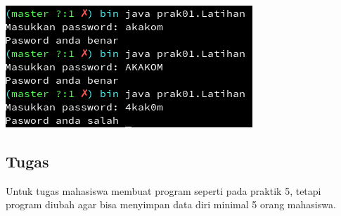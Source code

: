 \documentclass[a4paper,12pt]{article}
\begin{document}
\begin{center}
    \includegraphics[width=\textwidth]{9.png} 
\end{center}

\subsection{Tugas}
Untuk tugas mahasiswa membuat program seperti pada praktik 5,
tetapi program diubah agar bisa menyimpan data diri minimal
5 orang mahasiswa.
\end{document}
